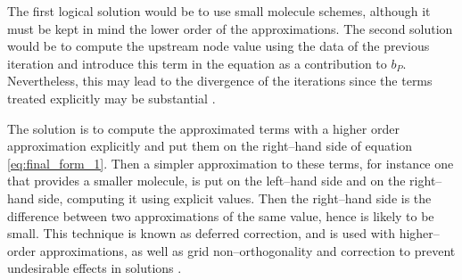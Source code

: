 The first logical solution would be to use small molecule schemes, although it
must be kept in mind the lower order of the approximations. The second solution
would be to compute the upstream node value using the data of the previous
iteration and introduce this term in the equation as a contribution to $b_P$.
Nevertheless, this may lead to the divergence of the iterations since the terms
treated explicitly may be substantial \cite{ferziger2002computational5deferred}.


The solution is to compute the approximated terms with a higher order
approximation explicitly and put them on the right--hand side of equation
\eqref{eq:final_form_1}. Then a simpler approximation to these terms, for
instance one that provides a smaller molecule, is put on the left--hand side and
on the right--hand side, computing it using explicit values. Then the
right--hand side is the difference between two approximations of the same value,
hence is likely to be small. This technique is known as deferred correction, and
is used with higher--order approximations, as well as grid non--orthogonality
and correction to prevent undesirable effects in solutions
\cite{ferziger2002computational5deferred}.

